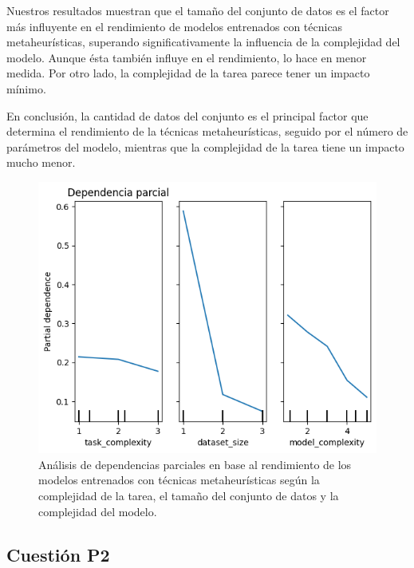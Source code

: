 Nuestros resultados muestran que el tamaño del conjunto de datos es el factor más influyente en el rendimiento de modelos entrenados con técnicas metaheurísticas, superando significativamente la influencia de la complejidad del modelo. Aunque ésta también influye en el rendimiento, lo hace en menor medida. Por otro lado, la complejidad de la tarea parece tener un impacto mínimo.

En conclusión, la cantidad de datos del conjunto es el principal factor que determina el rendimiento de la técnicas metaheurísticas, seguido por el número de parámetros del modelo, mientras que la complejidad de la tarea tiene un impacto mucho menor.

\begin{figure}
    \centering
    \includegraphics[width=0.75\linewidth]{Plantilla_TFG_latex//imagenes//Inf//Resultados/P3/dependencia_parcial.png}
    \caption{Análisis de dependencias parciales en base al rendimiento de los modelos entrenados con técnicas metaheurísticas según la complejidad de la tarea, el tamaño del conjunto de datos y la complejidad del modelo.}
    \label{fig:P1rf}
\end{figure}





\subsection{Cuestión P2}

